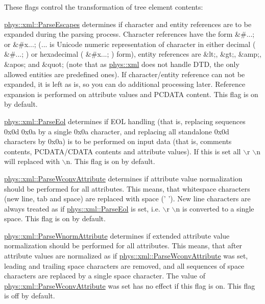 These flags control the transformation of tree element contents:
\begin{DoxyItemize}
\item \hyperlink{namespacephys_1_1xml_a6463412ba9e404b6890e4721255cd8ed}{phys::xml::ParseEscapes} determines if character and entity references are to be expanded during the parsing process. Character references have the form \&\#...; or \&\#x...; (... is Unicode numeric representation of character in either decimal ( \&\#...; ) or hexadecimal ( \&\#x...; ) form), entity references are \&lt;, \&gt;, \&amp;, \&apos; and \&quot; (note that as \hyperlink{namespacephys_1_1xml}{phys::xml} does not handle DTD, the only allowed entities are predefined ones). If character/entity reference can not be expanded, it is left as is, so you can do additional processing later. Reference expansion is performed on attribute values and PCDATA content. This flag is on by default.
\item \hyperlink{namespacephys_1_1xml_a52af747730d2b3a313eebed4cf49a333}{phys::xml::ParseEol} determines if EOL handling (that is, replacing sequences 0x0d 0x0a by a single 0x0a character, and replacing all standalone 0x0d characters by 0x0a) is to be performed on input data (that is, comments contents, PCDATA/CDATA contents and attribute values). If this is set all $\backslash$r $\backslash$n will replaced with $\backslash$n. This flag is on by default.
\item \hyperlink{namespacephys_1_1xml_af9f7575e3cb8a0d8ad9a7ceee5e26983}{phys::xml::ParseWconvAttribute} determines if attribute value normalization should be performed for all attributes. This means, that whitespace characters (new line, tab and space) are replaced with space (' '). New line characters are always treated as if \hyperlink{namespacephys_1_1xml_a52af747730d2b3a313eebed4cf49a333}{phys::xml::ParseEol} is set, i.e. $\backslash$r $\backslash$n is converted to a single space. This flag is on by default.
\item \hyperlink{namespacephys_1_1xml_acddcc88320f06c933c67cdd77704c838}{phys::xml::ParseWnormAttribute} determines if extended attribute value normalization should be performed for all attributes. This means, that after attribute values are normalized as if \hyperlink{namespacephys_1_1xml_af9f7575e3cb8a0d8ad9a7ceee5e26983}{phys::xml::ParseWconvAttribute} was set, leading and trailing space characters are removed, and all sequences of space characters are replaced by a single space character. The value of \hyperlink{namespacephys_1_1xml_af9f7575e3cb8a0d8ad9a7ceee5e26983}{phys::xml::ParseWconvAttribute} was set has no effect if this flag is on. This flag is off by default.
\end{DoxyItemize}

